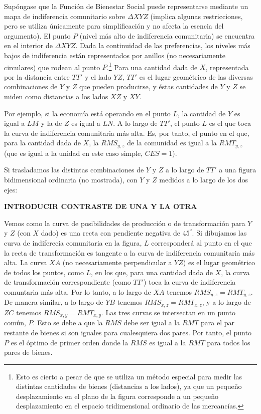 \documentclass[10pt,a4paper]{article}
\begin{document}
Supóngase que la Función de Bienestar Social puede representarse mediante un mapa de indiferencia comunitario sobre $\Delta XYZ$ (implica algunas restricciones, pero se utiliza únicamente para simplificación y no afecta la esencia del argumento). El punto $P$ (nivel más alto de indiferencia comunitaria) se encuentra en el interior de $\Delta XYZ$. Dada la continuidad de las preferencias, los niveles más bajos de indiferencia están representados por anillos (no necesariamente circulares) que rodean al punto $P$.\footnote{%
    Esto es cierto a pesar de que se utiliza un método especial para medir las distintas cantidades de bienes (distancias a los lados), ya que un pequeño desplazamiento en el plano de la figura corresponde a un pequeño desplazamiento en el espacio tridimensional ordinario de las mercancías.
} Para una cantidad dada de $X$, representada por la distancia entre $TT'$ y el lado $YZ$, $TT'$ es el lugar geométrico de las diversas combinaciones de $Y$ y $Z$ que pueden producirse, y éstas cantidades de $Y$ y $Z$ se miden como distancias a los lados $XZ$ y $XY$. 

Por ejemplo, si la economía está operando en el punto $L$, la cantidad de $Y$ es igual a $LM$ y la de $Z$ es igual a $LN$. A lo largo de $TT′$, el punto $L$ es el que toca la curva de indiferencia comunitaria más alta. Es, por tanto, el punto en el que, para la cantidad dada de $X$, la $RMS_{y,z}$ de la comunidad es igual a la $RMT_{y,z}$ (que es igual a la unidad en este caso simple, $CES=1$).

Si trasladamos las distintas combinaciones de $Y$ y $Z$ a lo largo de $TT′$ a una figura bidimensional ordinaria (no mostrada), con $Y$ y $Z$ medidos a lo largo de los dos ejes:

\textbf{INTRODUCIR CONTRASTE DE UNA Y LA OTRA}

Vemos como la curva de posibilidades de producción o de transformación para $Y$ y $Z$ (con $X$ dado) es una recta con pendiente negativa de $45^º$. Si dibujamos las curva de indiferecia comunitaria en la figura, $L$ corresponderá al punto en el que la recta de transformación es tangente a la curva de indiferencia comunitaria más alta. La curva $XA$ (no necesariamente perpendicular a $YZ$) es el lugar geométrico de todos los puntos, como $L$, en los que, para una cantidad dada de $X$, la curva de transformación correspondiente (como $TT′$) toca la curva de indiferencia comuntaria más alta. Por lo tanto, a lo largo de $XA$ tenemos $RMS_{y,z}=RMT_{y,z}$. De manera similar, a lo largo de $YB$ tenemos $RMS_{x,z}=RMT_{x,z}$, y a lo largo de $ZC$ tenemos $RMS_{x,y}=RMT_{x,y}$. Las tres curvas se intersectan en un punto común, $P$. Esto se debe a que la $RMS$ debe ser igual a la $RMT$ para el par restante de bienes si son iguales para cualesquiera dos pares. Por tanto, el punto $P$ es el óptimo de primer orden donde la $RMS$ es igual a la $RMT$ para todos los pares de bienes.
\end{document}
